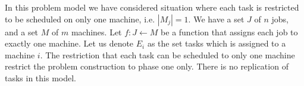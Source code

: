 \documentclass[10pt, conference, compsocconf]{IEEEtran}
\begin{document}
In this problem model we have considered  situation where each task is restricted to be scheduled on only one machine, i.e. $|M_j|=1$.  We have a set $J$ of $ n$ jobs, and a set $M$ of $m$ machines.  Let $f : J \leftarrow M$ be a function that assigns each job to exactly one machine. Let us denote $E_{i}$ as the set tasks which is assigned to a machine $i$.  The restriction that each task can be scheduled to only one machine restrict the problem construction to phase one only. There is no replication of tasks in this model.                                                                                                                                                                                                                                                                                                                                                                                                                                                                                                                                                                                                                                                                                                                                                                                                                                                                                                                                                                                                                                                                                                                                                                                                                                                                                                                                                                                                                                                                                                                                                                                                                                                                                                                                                                                                                                                                                                                                                                                                                                                                                                                                                                                                                                                                                                                                                                                                                                                                                                                                                                                                                                                                                                                                                                                                                                                                                                                       
\end{document}
